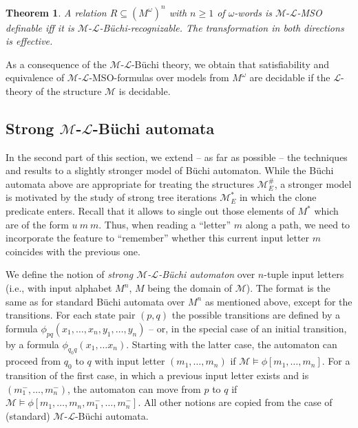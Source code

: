 \documentclass[copyright,creativecommons]{eptcs}
\newtheorem{theorem}{Theorem}
\theoremstyle{plain}
\theoremstyle{nonumberplain}
\newcommand{\m}{\ensuremath{\mathcal{M}}}
\newcommand{\el}{\ensuremath{\mathcal{L}}}
\newcommand{\ml}{\ensuremath{\m\textrm{-}\el}}
\newcommand{\MweakE}{\ensuremath{\m^{\#}_E}}
\newcommand{\MstrongE}{\ensuremath{\m^*_E}}
\begin{document}
\begin{theorem}\label{theo:maintheobuechi}
A relation $R \subseteq (M^{\omega})^n$ with $n\geq 1$ of $\omega$-words is \ml-MSO definable  iff 
it is \ml-B{\"u}chi-recognizable. The transformation in both directions is effective.
\end{theorem}

As a consequence of the \ml-B{\"u}chi theory, we obtain that satisfiability and 
equivalence of \ml-MSO-formulas over models from $M^\omega$ are 
decidable if the $\el$-theory of the structure $\m$ is decidable.



\subsection{Strong $\m$-$\el$-B\"uchi automata}



In the second part of this section, we extend -- as far as possible -- 
the techniques and results to a 
slightly stronger model of B\"uchi automaton. While the B\"uchi automata above 
are appropriate for treating the structures $\MweakE$, a stronger model is motivated by 
the study of strong tree iterations $\MstrongE$ in which the clone predicate 
enters. Recall that it allows to single out those elements of $M^*$ which are 
of the form $u \ m \ m$. Thus, when reading a ``letter'' $m$ along a path, we need to incorporate 
the feature to ``remember'' whether this current input letter $m$ coincides with the 
previous one.  

We define the notion of {\em strong $\m$-$\el$-B\"uchi automaton} over 
$n$-tuple input letters (i.e., with input alphabet $M^n$, $M$ being the domain of $\m$). The format is the same as for standard B{\"u}chi automata over $M^n$ as mentioned above, except for the transitions. 
For each state pair $(p,q)$ 
 the possible transitions are defined by a formula $\phi_{pq}(x_1, \ldots, x_n, 
y_1, \ldots , y_n)$ -- or, in the special case of an initial transition, by 
a formula $\phi_{q_0 q}(x_1, \ldots x_n)$. Starting with the latter case, 
the automaton can proceed from $q_0$ to $q$ with input letter $(m_1, \ldots, m_n)$ 
if $\m \models \phi[m_1, \ldots, m_n]$. For a transition of the first case, 
in which a previous input letter exists and is $(m^-_1, \ldots, m^-_n)$, 
the automaton can move from $p$ to $q$ if $\m \models \phi[m_1, \ldots, m_n, m^-_1, \ldots, m^-_n]$.
All other notions are copied from the case of (standard) $\m$-$\el$-B\"uchi automata. 
\end{document}
